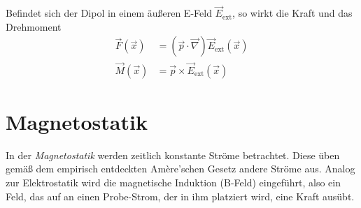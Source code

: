 \documentclass{article}
\begin{document}
Befindet sich der Dipol in einem äußeren E-Feld $\vec{E}_\text{ext}$, so wirkt die Kraft und das Drehmoment
	\begin{align}
		\vec{F}(\vec{x}) &= (\vec{p} \cdot \vec{\nabla}) \vec{E}_\text{ext}(\vec{x}) \\
		\vec{M}(\vec{x}) &= \vec{p} \times \vec{E}_\text{ext}(\vec{x})
	\end{align}


\newpage


\section{Magnetostatik}
In der \textit{Magnetostatik} werden zeitlich konstante Ströme betrachtet. Diese üben gemäß dem empirisch entdeckten Amère'schen Gesetz andere Ströme aus. Analog zur Elektrostatik wird die magnetische Induktion (B-Feld) eingeführt, also ein Feld, das auf an einen Probe-Strom, der in ihm platziert wird, eine Kraft ausübt.
\end{document}
